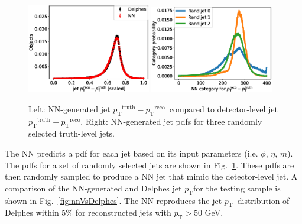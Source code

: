 \documentclass[showpacs,showkeys,preprint,prd,nofootinbib,linenumbers,12pt]{revtex4-1}
\def\pt{\ensuremath{p_{\mathrm{T}}}}
\def\ptRes{\ensuremath{\pt^{\mathrm{truth}}-\pt^{\mathrm{reco}}}}
\begin{document}
\begin{figure}[htb]
  \includegraphics[width=0.48\textwidth]{figures/nn/jet_pTRes_batchSize10.eps}
  \includegraphics[width=0.48\textwidth]{figures/nn/nnOutput_pT_batchSize10.eps}
  \caption{Left: NN-generated jet \ptRes\ compared to detector-level jet \ptRes. Right: NN-generated jet pdfs for three randomly selected truth-level jets.}
  \label{fig:pdfComp}
\end{figure}

The NN predicts a pdf for each jet based on its input parameters (i.e. $\phi$, $\eta$, $m$). The pdfs for a set of randomly selected jets are shown in Fig.~\ref{fig:pdfComp}. These pdfs are then randomly sampled to produce a NN jet that mimic the detector-level jet. A comparison of the NN-generated and Delphes jet \pt for the testing sample is shown in Fig.~\ref{fig:nnVsDelphes}. The NN reproduces the jet \pt\ distribution of Delphes within 5\% for reconstructed jets with $\pt>50$ GeV. 
\end{document}
